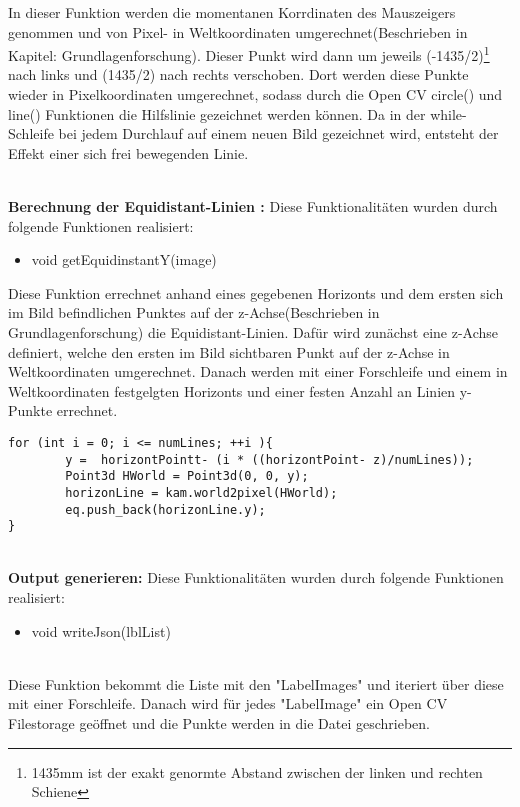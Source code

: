 \documentclass[11pt]{scrartcl}
\begin{document}
\noindent
In dieser Funktion werden die momentanen Korrdinaten des Mauszeigers genommen und von Pixel- in Weltkoordinaten umgerechnet(Beschrieben in Kapitel: Grundlagenforschung). Dieser Punkt wird dann um jeweils (-1435/2)\footnote{1435mm ist der exakt genormte Abstand zwischen der linken und rechten Schiene} nach links und (1435/2) nach rechts verschoben. Dort werden diese Punkte wieder in Pixelkoordinaten umgerechnet, sodass durch die Open CV circle() und line() Funktionen die Hilfslinie gezeichnet werden können. Da in der while-Schleife bei jedem Durchlauf auf einem neuen Bild gezeichnet wird, entsteht der Effekt einer sich frei bewegenden Linie.

\noindent
\\
\textbf{Berechnung der Equidistant-Linien :}
\noindent
Diese Funktionalitäten wurden durch folgende Funktionen realisiert:
\begin{itemize}
	\item void getEquidinstantY(image)
\end{itemize}

\noindent
Diese Funktion errechnet anhand eines gegebenen Horizonts und dem ersten sich im Bild befindlichen Punktes auf der z-Achse(Beschrieben in Grundlagenforschung) die Equidistant-Linien. Dafür wird zunächst eine z-Achse definiert, welche den ersten im Bild sichtbaren Punkt auf der z-Achse in Weltkoordinaten umgerechnet. Danach werden mit einer Forschleife und einem in Weltkoordinaten festgelgten Horizonts und einer festen Anzahl an Linien y-Punkte errechnet.
\begin{lstlisting}
for (int i = 0; i <= numLines; ++i ){
        y =  horizontPointt- (i * ((horizontPoint- z)/numLines));
        Point3d HWorld = Point3d(0, 0, y);
        horizonLine = kam.world2pixel(HWorld);
        eq.push_back(horizonLine.y);
}
\end{lstlisting}

\noindent
\\
\textbf{Output generieren:}
\noindent
Diese Funktionalitäten wurden durch folgende Funktionen realisiert:
\begin{itemize}
	\item void writeJson(lblList)
\end{itemize}
\noindent
\\
Diese Funktion bekommt die Liste mit den "LabelImages" und iteriert über diese mit einer Forschleife. Danach wird für jedes "LabelImage" ein Open CV Filestorage geöffnet und die Punkte werden in die Datei geschrieben.
\end{document}
